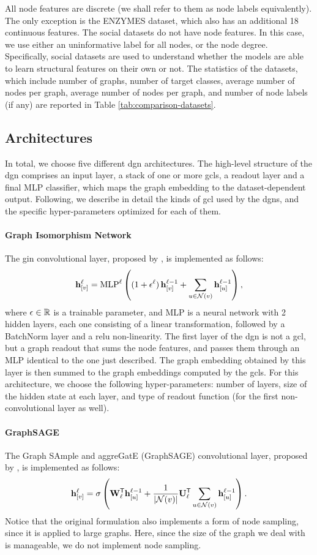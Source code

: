 All node features are discrete (we shall refer to them as node labels equivalently). The only exception is the ENZYMES dataset, which also has an additional 18 continuous features. The social datasets do not have node features. In this case, we use either an uninformative label for all nodes, or the node degree. Specifically, social datasets are used to understand whether the models are able to learn structural features on their own or not. The statistics of the datasets, which include number of graphs, number of target classes, average number of nodes per graph, average number of nodes per graph, and number of node labels (if any) are reported in Table \ref{tab:comparison-datasets}.


\subsection{Architectures}
In total, we choose five different \gls{dgn} architectures. The high-level structure of the \gls{dgn} comprises an input layer, a stack of one or more \glspl{gcl}, a readout layer and a final MLP classifier, which maps the graph embedding to the dataset-dependent output. Following, we describe in detail the kinds of \gls{gcl} used by the \glspl{dgn}, and the specific hyper-parameters optimized for each of them. 

\paragraph{Graph Isomorphism Network} The \gls{gin} convolutional layer, proposed by \cite{?}, is implemented as follows:
$$\Elem{h}{v}^{\ell} = \Fun{MLP}^{\ell} \Paren{(1 + \epsilon^{\ell})\,\Elem{h}{v}^{\ell-1} + \sum_{u \in \Cal{N}(v)} \Elem{h}{u}^{\ell-1}},$$
where $\epsilon \in \mathbb{R}$ is a trainable parameter, and MLP is a neural network with 2 hidden layers, each one consisting of a linear transformation, followed by a BatchNorm layer and a \gls{relu} non-linearity. The first layer of the \gls{dgn} is not a \gls{gcl}, but a graph readout that sums the node features, and passes them through an MLP identical to the one just described. The graph embedding obtained by this layer is then summed to the graph embeddings computed by the \glspl{gcl}. For this architecture, we choose the following hyper-parameters: number of layers, size of the hidden state at each layer, and type of readout function (for the first non-convolutional layer as well).

\paragraph{GraphSAGE} 
The Graph SAmple and aggreGatE (GraphSAGE) convolutional layer, proposed by \cite{?}, is implemented as follows:
$$\Elem{h}{v}^{\ell} = \sigma\Paren{\Matrix{W}^{\Transpose}_{\ell}\Elem{h}{u}^{\ell-1} + \frac{1}{|\Cal{N}(v)|} \Matrix{U}^{\Transpose}_{\ell} \sum_{u \in \Cal{N}(v)} \Elem{h}{u}^{\ell-1}}.$$
Notice that the original formulation also implements a form of node sampling, since it is applied to large graphs. Here, since the size of the graph we deal with is manageable, we do not implement node sampling.

